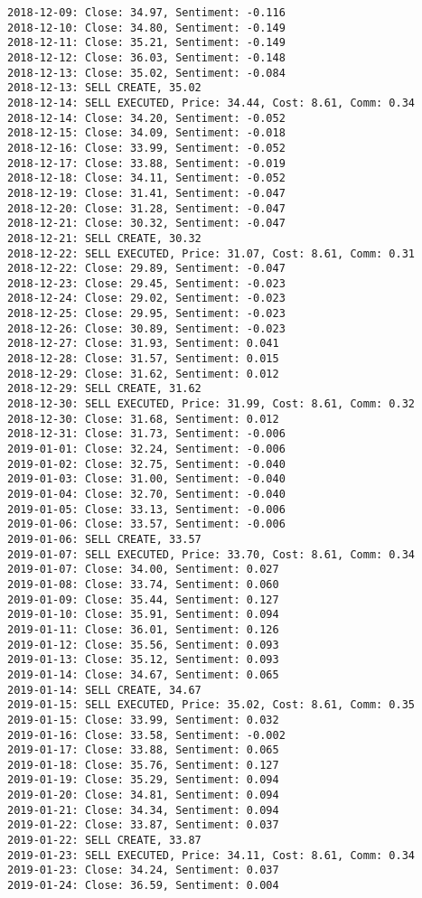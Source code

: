 \documentclass[11pt]{article}
\begin{document}
\begin{Verbatim}[commandchars=\\\{\}]
2018-12-09: Close: 34.97, Sentiment: -0.116
2018-12-10: Close: 34.80, Sentiment: -0.149
2018-12-11: Close: 35.21, Sentiment: -0.149
2018-12-12: Close: 36.03, Sentiment: -0.148
2018-12-13: Close: 35.02, Sentiment: -0.084
2018-12-13: SELL CREATE, 35.02
2018-12-14: SELL EXECUTED, Price: 34.44, Cost: 8.61, Comm: 0.34
2018-12-14: Close: 34.20, Sentiment: -0.052
2018-12-15: Close: 34.09, Sentiment: -0.018
2018-12-16: Close: 33.99, Sentiment: -0.052
2018-12-17: Close: 33.88, Sentiment: -0.019
2018-12-18: Close: 34.11, Sentiment: -0.052
2018-12-19: Close: 31.41, Sentiment: -0.047
2018-12-20: Close: 31.28, Sentiment: -0.047
2018-12-21: Close: 30.32, Sentiment: -0.047
2018-12-21: SELL CREATE, 30.32
2018-12-22: SELL EXECUTED, Price: 31.07, Cost: 8.61, Comm: 0.31
2018-12-22: Close: 29.89, Sentiment: -0.047
2018-12-23: Close: 29.45, Sentiment: -0.023
2018-12-24: Close: 29.02, Sentiment: -0.023
2018-12-25: Close: 29.95, Sentiment: -0.023
2018-12-26: Close: 30.89, Sentiment: -0.023
2018-12-27: Close: 31.93, Sentiment: 0.041
2018-12-28: Close: 31.57, Sentiment: 0.015
2018-12-29: Close: 31.62, Sentiment: 0.012
2018-12-29: SELL CREATE, 31.62
2018-12-30: SELL EXECUTED, Price: 31.99, Cost: 8.61, Comm: 0.32
2018-12-30: Close: 31.68, Sentiment: 0.012
2018-12-31: Close: 31.73, Sentiment: -0.006
2019-01-01: Close: 32.24, Sentiment: -0.006
2019-01-02: Close: 32.75, Sentiment: -0.040
2019-01-03: Close: 31.00, Sentiment: -0.040
2019-01-04: Close: 32.70, Sentiment: -0.040
2019-01-05: Close: 33.13, Sentiment: -0.006
2019-01-06: Close: 33.57, Sentiment: -0.006
2019-01-06: SELL CREATE, 33.57
2019-01-07: SELL EXECUTED, Price: 33.70, Cost: 8.61, Comm: 0.34
2019-01-07: Close: 34.00, Sentiment: 0.027
2019-01-08: Close: 33.74, Sentiment: 0.060
2019-01-09: Close: 35.44, Sentiment: 0.127
2019-01-10: Close: 35.91, Sentiment: 0.094
2019-01-11: Close: 36.01, Sentiment: 0.126
2019-01-12: Close: 35.56, Sentiment: 0.093
2019-01-13: Close: 35.12, Sentiment: 0.093
2019-01-14: Close: 34.67, Sentiment: 0.065
2019-01-14: SELL CREATE, 34.67
2019-01-15: SELL EXECUTED, Price: 35.02, Cost: 8.61, Comm: 0.35
2019-01-15: Close: 33.99, Sentiment: 0.032
2019-01-16: Close: 33.58, Sentiment: -0.002
2019-01-17: Close: 33.88, Sentiment: 0.065
2019-01-18: Close: 35.76, Sentiment: 0.127
2019-01-19: Close: 35.29, Sentiment: 0.094
2019-01-20: Close: 34.81, Sentiment: 0.094
2019-01-21: Close: 34.34, Sentiment: 0.094
2019-01-22: Close: 33.87, Sentiment: 0.037
2019-01-22: SELL CREATE, 33.87
2019-01-23: SELL EXECUTED, Price: 34.11, Cost: 8.61, Comm: 0.34
2019-01-23: Close: 34.24, Sentiment: 0.037
2019-01-24: Close: 36.59, Sentiment: 0.004

\end{Verbatim}
\end{document}
